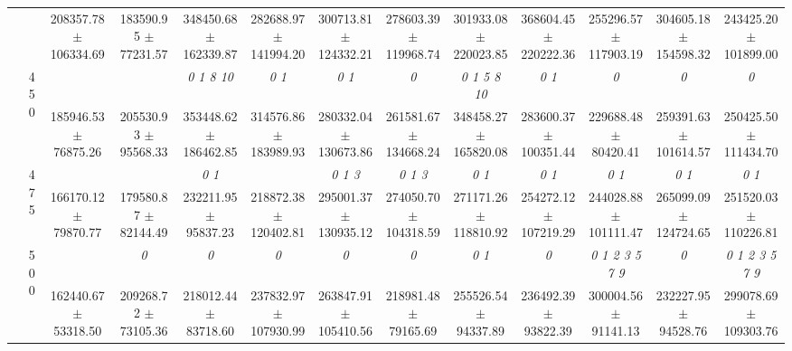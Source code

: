 \begin{table}[h]
{\begin{tabular}{
        ccccccccccccc}
 & & \cellcolor[HTML]{EFEFEF} 208357.78 $\pm$ 106334.69& \cellcolor[HTML]{EFEFEF} 183590.95 $\pm$ 77231.57& \cellcolor[HTML]{EFEFEF} 348450.68 $\pm$ 162339.87& \cellcolor[HTML]{EFEFEF} 282688.97 $\pm$ 141994.20& \cellcolor[HTML]{EFEFEF} 300713.81 $\pm$ 124332.21& \cellcolor[HTML]{EFEFEF} 278603.39 $\pm$ 119968.74& \cellcolor[HTML]{EFEFEF} 301933.08 $\pm$ 220023.85& \cellcolor[HTML]{EFEFEF} 368604.45 $\pm$ 220222.36& \cellcolor[HTML]{EFEFEF} 255296.57 $\pm$ 117903.19& \cellcolor[HTML]{EFEFEF} 304605.18 $\pm$ 154598.32& \cellcolor[HTML]{EFEFEF} 243425.20 $\pm$ 101899.00 \\ 
 & \multirow{2}{*}{450}& & & \textit{  0  1  8 10 }& \textit{ 0 1 }& \textit{ 0 1 }& \textit{ 0 }& \textit{  0  1  5  8 10 }& \textit{ 0 1 }& \textit{ 0 }& \textit{ 0 }& \textit{ 0 } \\ 
 & & 185946.53 $\pm$ 76875.26& 205530.93 $\pm$ 95568.33& 353448.62 $\pm$ 186462.85& 314576.86 $\pm$ 183989.93& 280332.04 $\pm$ 130673.86& 261581.67 $\pm$ 134668.24& 348458.27 $\pm$ 165820.08& 283600.37 $\pm$ 100351.44& 229688.48 $\pm$ 80420.41& 259391.63 $\pm$ 101614.57& 250425.50 $\pm$ 111434.70 \\ 
 & \multirow{2}{*}{475}& \cellcolor[HTML]{EFEFEF} & \cellcolor[HTML]{EFEFEF} & \cellcolor[HTML]{EFEFEF} \textit{ 0 1 }& \cellcolor[HTML]{EFEFEF} & \cellcolor[HTML]{EFEFEF} \textit{ 0 1 3 }& \cellcolor[HTML]{EFEFEF} \textit{ 0 1 3 }& \cellcolor[HTML]{EFEFEF} \textit{ 0 1 }& \cellcolor[HTML]{EFEFEF} \textit{ 0 1 }& \cellcolor[HTML]{EFEFEF} \textit{ 0 1 }& \cellcolor[HTML]{EFEFEF} \textit{ 0 1 }& \cellcolor[HTML]{EFEFEF} \textit{ 0 1 } \\ 
 & & \cellcolor[HTML]{EFEFEF} 166170.12 $\pm$ 79870.77& \cellcolor[HTML]{EFEFEF} 179580.87 $\pm$ 82144.49& \cellcolor[HTML]{EFEFEF} 232211.95 $\pm$ 95837.23& \cellcolor[HTML]{EFEFEF} 218872.38 $\pm$ 120402.81& \cellcolor[HTML]{EFEFEF} 295001.37 $\pm$ 130935.12& \cellcolor[HTML]{EFEFEF} 274050.70 $\pm$ 104318.59& \cellcolor[HTML]{EFEFEF} 271171.26 $\pm$ 118810.92& \cellcolor[HTML]{EFEFEF} 254272.12 $\pm$ 107219.29& \cellcolor[HTML]{EFEFEF} 244028.88 $\pm$ 101111.47& \cellcolor[HTML]{EFEFEF} 265099.09 $\pm$ 124724.65& \cellcolor[HTML]{EFEFEF} 251520.03 $\pm$ 110226.81 \\ 
 & \multirow{2}{*}{500}& & \textit{ 0 }& \textit{ 0 }& \textit{ 0 }& \textit{ 0 }& \textit{ 0 }& \textit{ 0 1 }& \textit{ 0 }& \textit{ 0 1 2 3 5 7 9 }& \textit{ 0 }& \textit{ 0 1 2 3 5 7 9 } \\ 
 & & 162440.67 $\pm$ 53318.50& 209268.72 $\pm$ 73105.36& 218012.44 $\pm$ 83718.60& 237832.97 $\pm$ 107930.99& 263847.91 $\pm$ 105410.56& 218981.48 $\pm$ 79165.69& 255526.54 $\pm$ 94337.89& 236492.39 $\pm$ 93822.39& 300004.56 $\pm$ 91141.13& 232227.95 $\pm$ 94528.76& 299078.69 $\pm$ 109303.76 \\ 

\end{tabular}}
\end{table}
